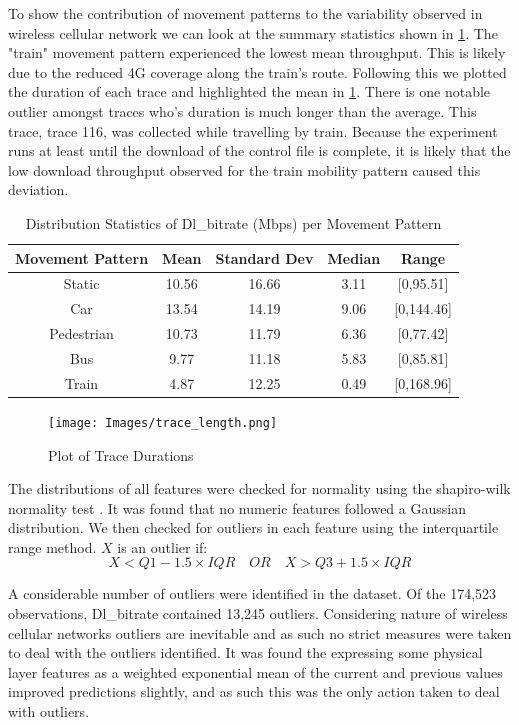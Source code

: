 To show the contribution of movement patterns to the variability observed in wireless cellular network we can look at the summary statistics shown in \ref{tab:dl_dist_movement}. The "train" movement pattern experienced the lowest mean throughput. This is likely due to the reduced 4G coverage along the train's route. Following this we plotted the duration of each trace and highlighted the mean in \ref{fig:trace_length}. There is one notable outlier amongst traces who's duration is much longer than the average. This trace, trace 116, was collected while travelling by train. Because the experiment runs at least until the download of the control file is complete, it is likely that the low download throughput observed for the train mobility pattern caused this deviation.

\begin{table}[!htb]
  \centering
  \caption{Distribution Statistics of Dl\_bitrate (Mbps) per Movement Pattern}
  \begin{tabular}{|c|c|c|c|c|}
    \hline
     Movement Pattern & Mean & Standard Dev & Median & Range \\
    \hline
     Static & 10.56 & 16.66 & 3.11 & [0,95.51] \\
     Car & 13.54 & 14.19 & 9.06 & [0,144.46] \\
     Pedestrian & 10.73 & 11.79 & 6.36 & [0,77.42] \\
     Bus & 9.77 & 11.18 & 5.83 & [0,85.81] \\
     Train & 4.87 & 12.25 & 0.49 & [0,168.96] \\
    \hline
  \end{tabular}
  \label{tab:dl_dist_movement}
\end{table}

\begin{figure}[H]
\texttt{[image: Images/trace\_length.png]}
\centering
\caption{Plot of Trace Durations}
\label{fig:trace_length}
\end{figure}

The distributions of all features were checked for normality using the shapiro-wilk normality test \cite{razali2011power}. It was found that no numeric features followed a Gaussian distribution. We then checked for outliers in each feature using the interquartile range method. $X$ is an outlier if:
\begin{equation}
X < Q1-1.5\times IQR \quad OR \quad X > Q3+1.5\times IQR
\end{equation}

A considerable number of outliers were identified in the dataset. Of the 174,523 observations, Dl\_bitrate contained 13,245 outliers. Considering nature of wireless cellular networks outliers are inevitable and as such no strict measures were taken to deal with the outliers identified. It was found the expressing some physical layer features as a weighted exponential mean of the current and previous values improved predictions slightly, and as such this was the only action taken to deal with outliers.

